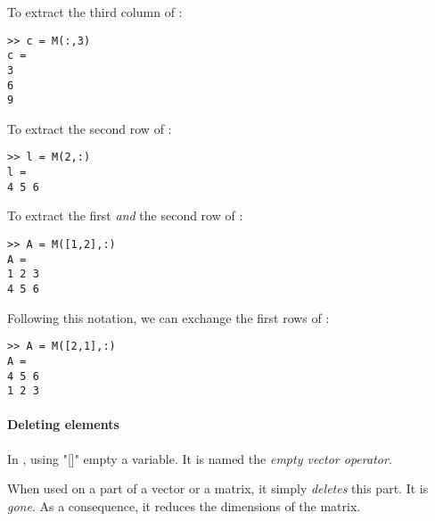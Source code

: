 To extract the third column of :

\begin{lstlisting}
>> c = M(:,3)
c = 
3
6
9
\end{lstlisting}


To extract the second row of :

\begin{lstlisting}
>> l = M(2,:)
l = 
4 5 6
\end{lstlisting}

To extract the first \emph{and} the second row of :
\begin{lstlisting}
>> A = M([1,2],:)
A = 
1 2 3
4 5 6
\end{lstlisting}

Following this notation, we can exchange the first rows of :
\begin{lstlisting}
>> A = M([2,1],:)
A = 
4 5 6
1 2 3
\end{lstlisting}





\paragraph{Deleting elements}




In \matlab, using "[]" empty a variable. It is named the \emph{empty vector operator}.
	
When used on a part of a vector or a matrix, it simply \emph{deletes} this part.
It is \emph{gone}.
As a consequence, it reduces the dimensions of the matrix.



